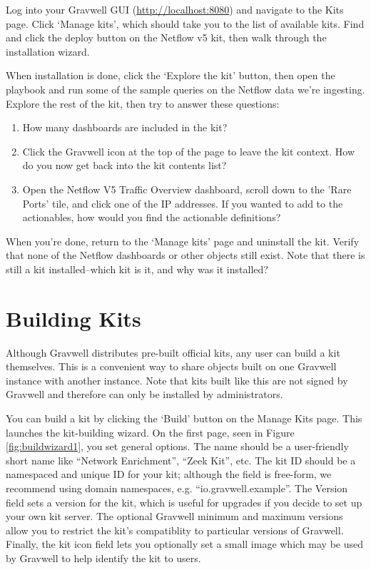 Log into your Gravwell GUI (\href{http://localhost:8080}{http://localhost:8080}) and navigate to the Kits page. Click `Manage kits', which should take you to the list of available kits. Find and click the deploy button on the Netflow v5 kit, then walk through the installation wizard.

When installation is done, click the `Explore the kit' button, then open the playbook and run some of the sample queries on the Netflow data we're ingesting. Explore the rest of the kit, then try to answer these questions:

\begin{enumerate}
\item
	How many dashboards are included in the kit?
\item
	Click the Gravwell icon at the top of the page to leave the kit context. How do you now get back into the kit contents list?
\item
	Open the Netflow V5 Traffic Overview dashboard, scroll down to the 'Rare Ports' tile, and click one of the IP addresses. If you wanted to add to the actionables, how would you find the actionable definitions?
\end{enumerate}

When you're done, return to the `Manage kits' page and uninstall the kit. Verify that none of the Netflow dashboards or other objects still exist. Note that there is still a kit installed--which kit is it, and why was it installed?

\section{Building Kits}

Although Gravwell distributes pre-built official kits, any user can build a kit themselves. This is a convenient way to share objects built on one Gravwell instance with another instance. Note that kits built like this are not signed by Gravwell and therefore can only be installed by administrators.

You can build a kit by clicking the `Build' button on the Manage Kits page. This launches the kit-building wizard. On the first page, seen in Figure \ref{fig:buildwizard1}, you set general options. The name should be a user-friendly short name like ``Network Enrichment'', ``Zeek Kit'', etc. The kit ID should be a namespaced and unique ID for your kit; although the field is free-form, we recommend using domain namespaces, e.g. ``io.gravwell.example''. The Version field sets a version for the kit, which is useful for upgrades if you decide to set up your own kit server. The optional Gravwell minimum and maximum versions allow you to restrict the kit's compatiblity to particular versions of Gravwell. Finally, the kit icon field lets you optionally set a small image which may be used by Gravwell to help identify the kit to users.

